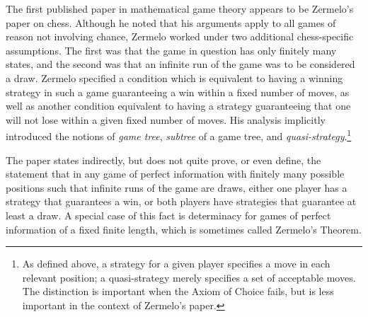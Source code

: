 \documentclass{book}%
\begin{document}
The first published paper in mathematical game theory appears to be
Zermelo's paper  on chess. Although he noted
that his arguments apply to all games of reason not involving chance, Zermelo
worked under two additional chess-specific assumptions. The
first was that the game in question has only finitely many states, and the second
was that an infinite run of the game was to be considered a draw.
Zermelo specified a condition which is equivalent
to having a
winning strategy in such a game guaranteeing a win within a fixed number of moves,
as well as another condition equivalent to having a strategy guaranteeing that one
will not lose within a given fixed number of moves. His analysis implicitly introduced
the notions of \emph{game tree},
\emph{subtree} of a game tree, and \emph{quasi-strategy}.\footnote{As defined above, a strategy for a given player specifies a move in each
relevant position; a quasi-strategy merely specifies a set of acceptable moves.
The distinction is important when the Axiom of Choice fails, but is less important in the context of Zermelo's paper.}

The paper states indirectly, but does not quite prove,
or even define, the statement
that in any game of perfect information with finitely many possible
positions such that infinite runs of the game are draws, either one
player has a strategy that guarantees a win, or both players have
strategies that guarantee at least a draw. A special case of this fact is
determinacy for games of perfect information of a fixed finite length,
which is sometimes called Zermelo's Theorem.%
\end{document}
